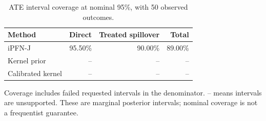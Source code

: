 \begin{table}[tb]
\centering
\caption{ATE interval coverage at nominal 95\%, with 50 observed outcomes.}
\begin{tabular}{lrrr}
\toprule
Method & Direct & Treated spillover & Total \\
\midrule
iPFN-J & 95.50\% & 90.00\% & 89.00\% \\
Kernel prior & -- & -- & -- \\
Calibrated kernel & -- & -- & -- \\
\bottomrule
\end{tabular}
\par\smallskip
\begin{minipage}{\linewidth}\scriptsize
Coverage includes failed requested intervals in the denominator. -- means intervals are unsupported.
These are marginal posterior intervals; nominal coverage is not a frequentist guarantee.
\end{minipage}
\end{table}
